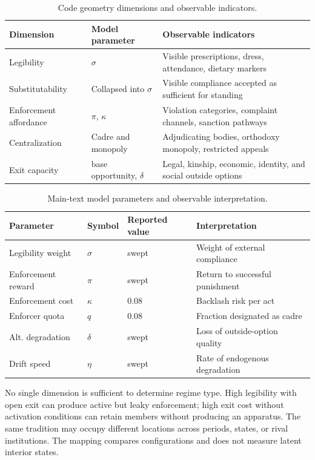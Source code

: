 \documentclass[12pt]{article}
\begin{document}
\begin{table}[htbp]
\centering
\caption{Code geometry dimensions and observable indicators.}
\begin{tabular}{lp{5.5cm}p{5.5cm}}
\toprule
Dimension & Model parameter & Observable indicators \\
\midrule
Legibility & $\sigma$ & Visible prescriptions, dress, attendance, dietary markers \\
Substitutability & Collapsed into $\sigma$ & Visible compliance accepted as sufficient for standing \\
Enforcement affordance & $\pi$, $\kappa$ & Violation categories, complaint channels, sanction pathways \\
Centralization & Cadre and monopoly & Adjudicating bodies, orthodoxy monopoly, restricted appeals \\
Exit capacity & base opportunity, $\delta$ & Legal, kinship, economic, identity, and social outside options \\
\bottomrule
\end{tabular}
\end{table}

\begin{table}[htbp]
\centering
\caption{Main-text model parameters and observable interpretation.}
\begin{tabular}{llll}
\toprule
Parameter & Symbol & Reported value & Interpretation \\
\midrule
Legibility weight & $\sigma$ & swept & Weight of external compliance \\
Enforcement reward & $\pi$ & swept & Return to successful punishment \\
Enforcement cost & $\kappa$ & 0.08 & Backlash risk per act \\
Enforcer quota & $q$ & 0.08 & Fraction designated as cadre \\
Alt. degradation & $\delta$ & swept & Loss of outside-option quality \\
Drift speed & $\eta$ & swept & Rate of endogenous degradation \\
\bottomrule
\end{tabular}
\end{table}

No single dimension is sufficient to determine regime type. High legibility
with open exit can produce active but leaky enforcement; high exit cost without
activation conditions can retain members without producing an apparatus.
The same tradition may occupy different locations across periods, states, or
rival institutions. The mapping compares configurations and does not measure
latent interior states.
\end{document}
